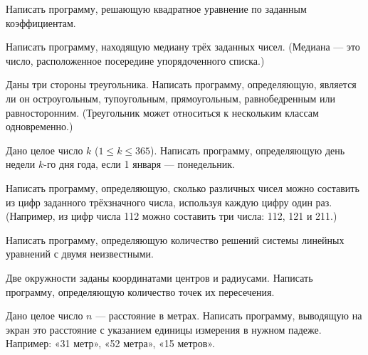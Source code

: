 \task Написать программу, решающую квадратное уравнение по заданным
коэффициентам.

\task Написать программу, находящую медиану трёх заданных
чисел. (Медиана — это число, расположенное посередине упорядоченного
списка.)

\task Даны три стороны треугольника. Написать программу, определяющую,
является ли он остроугольным, тупоугольным, прямоугольным,
равнобедренным или равносторонним. (Треугольник может относиться к
нескольким классам одновременно.)

\task Дано целое число $k$ ($1 \leqslant k \leqslant 365$). Написать
программу, определяющую день недели $k$-го дня года, если 1 января —
понедельник.

\task Написать программу, определяющую, сколько различных чисел можно
составить из цифр заданного трёхзначного числа, используя каждую цифру
один раз. (Например, из цифр числа 112 можно составить три числа: 112,
121 и 211.)

\task Написать программу, определяющую количество решений системы
линейных уравнений с двумя неизвестными.

\task Две окружности заданы координатами центров и радиусами. Написать
программу, определяющую количество точек их пересечения.

\task Дано целое число $n$ — расстояние в метрах. Написать программу,
выводящую на экран это расстояние с указанием единицы измерения в
нужном падеже. Например: «31 метр», «52 метра», «15 метров».
